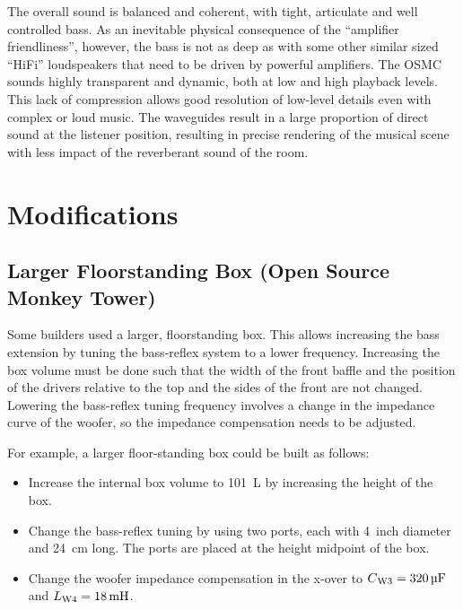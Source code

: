 \documentclass[12pt,a4paper]{article}
\providecommand{\inductor}[1]{L\textsubscript{#1}}
\providecommand{\capacitor}[1]{C\textsubscript{#1}}
\begin{document}
The overall sound is balanced and coherent, with tight, articulate and well controlled bass. As an inevitable physical consequence of the ``amplifier friendliness'', however, the bass is not as deep as with some other similar sized ``HiFi'' loudspeakers that need to be driven by powerful amplifiers. The OSMC sounds highly transparent and dynamic, both at low and high playback levels. This lack of compression allows good resolution of low-level details even with complex or loud music. The waveguides result in a large proportion of direct sound at the listener position, resulting in precise rendering of the musical scene with less impact of the reverberant sound of the room.

\clearpage

\section{Modifications}

\subsection{Larger Floorstanding Box (Open Source Monkey Tower)}
Some builders used a larger, floorstanding box. This allows increasing the bass extension by tuning the bass-reflex system to a lower frequency. Increasing the box volume must be done such that the width of the front baffle and the position of the drivers relative to the top and the sides of the front are not changed. Lowering the bass-reflex tuning frequency involves a change in the impedance curve of the woofer, so the impedance compensation needs to be adjusted.

For example, a larger floor-standing box could be built as follows:\cite{osmt_p144}
\begin{itemize}
\item Increase the internal box volume to \SI{101}{L} by increasing the height of the box.
\item Change the bass-reflex tuning by using two ports, each with \SI{4}{inch} diameter and \SI{24}{cm} long. The ports are placed at the height midpoint of the box.
\item Change the woofer impedance compensation in the x-over to $\capacitor{W3} = \SI{320}{\micro F}$ and $\inductor{W4} = \SI{18}{mH}$.
\end{itemize}


\clearpage



\end{document}
